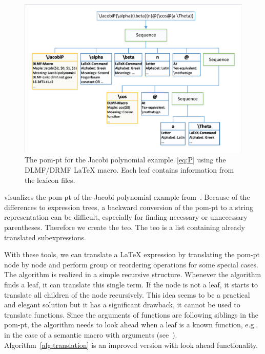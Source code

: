 \documentclass[a4paper,11pt]{article}
\theoremstyle{defTheoStyle}
\theoremstyle{defExampStyle}
\begin{document}
\begin{figure}[ht]
	\centering
	\includegraphics[clip, trim=0.2cm 0.2cm 0.2cm 0.2cm, scale=0.75]{SyntaxTreeUseCase.pdf}
	\caption{The \gls*{pom-pt} for the Jacobi polynomial example~\eqref{eq:P} using the DLMF/DRMF \LaTeX{} macro. Each leaf contains information from the lexicon files.}
	\label{fig:syntax-tree-usecase}
	\vspace{-10pt}
\end{figure}

 visualizes the \gls*{pom-pt} of the Jacobi polynomial example from~. Because of the differences to expression trees, a backward conversion of the \gls*{pom-pt} to a string representation can be difficult, especially for finding necessary or unnecessary parentheses. Therefore we create the \gls*{teo}. The \gls*{teo} is a list containing already translated subexpressions.

With these tools, we can translate a \LaTeX{} expression by translating the \gls*{pom-pt} node by node and perform group or reordering operations for some special cases. The algorithm is realized in a simple recursive structure. Whenever the algorithm finds a leaf, it can translate this single term. If the node is not a leaf, it starts to translate all children of the node recursively. This idea seems to be a practical and elegant solution but it has a significant drawback, it cannot be used to translate functions. Since the arguments of functions are following siblings in the \gls*{pom-pt}, the algorithm needs to look ahead when a leaf is a known function, e.g., in the case of a semantic macro with arguments (see~). Algorithm~\ref{alg:translation} is an improved version with look ahead functionality.
\end{document}
